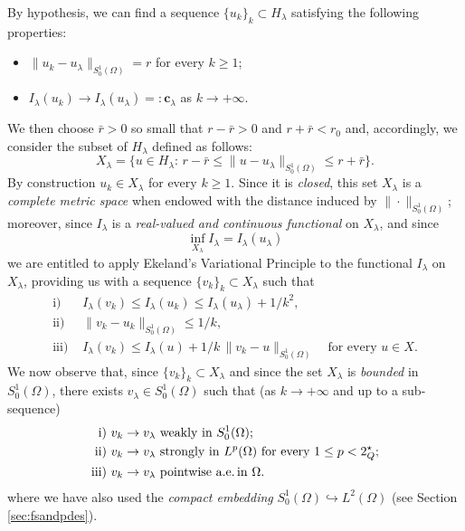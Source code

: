 \documentclass[11pt]{amsart}
\numberwithin{equation}{section} %
\theoremstyle{definition}
\begin{document}
By hypothesis,
we can find a sequence $\{u_k\}_k\subset H_{\lambda}$ satisfying the following properties:
\begin{itemize}
	\item $\|u_k-u_\lambda\|_{S^1_0(\Omega)} = r$ for every $k\geq 1$;	
	\item $I_\lambda(u_k)\to I_\lambda(u_\lambda) =:\mathbf{c}_\lambda$ as $k\to+\infty$.
\end{itemize}
We then choose $\bar r > 0$ so small that $r-\bar r > 0$ and $r+\bar r<r_0$ and,
accordingly, we consider the subset of $H_\lambda$ defined as follows:
$$X_\lambda = \{u\in H_\lambda:\,r-\bar r\leq\|u-u_\lambda\|_{S^1_0(\Omega)}\leq r+\bar r\}.$$
By construction $u_k\in X_\lambda$ for every $k\geq 1$.
Since it is \emph{closed}, this set $X_\lambda$
is a \emph{complete metric space} when endowed with the distance induced by $\|\cdot\|_{S^1_0(\Omega)}$;
moreover, since $I_\lambda$ is a \emph{real-valued and continuous functional} on $X_\lambda$, and since
$$\textstyle\inf_{X_\lambda}I_\lambda = I_\lambda(u_\lambda)$$
we are entitled to apply
 Ekeland's Variational Principle \cite{Ekeland} to the functional $I_\lambda$ on $X_\lambda$,
provi\-ding us with a sequence $\{v_k\}_k\subset X_\lambda$ such that
\begin{equation} \label{eq:EkelandCaseA}
	\begin{split}
		\mathrm{i)}&\,\, I_\lambda(v_k)\leq I_\lambda(u_k)\leq I_\lambda(u_\lambda)+1/k^2, \\
		\mathrm{ii)}&\,\,\|v_k-u_k\|_{S^1_0(\Omega)}\leq 1/k, \\
		\mathrm{iii)}&\,\, I_\lambda(v_k)\leq I_\lambda(u)+1/k\,
		\|v_k-u\|_{S^1_0(\Omega)}\quad\text{for every $u\in X$}.    
	\end{split}
\end{equation}
We now observe that, since $\{v_k\}_k\subset X_\lambda$ and since the set $X_\lambda$ is \emph{bounded}
in $S^1_0(\Omega)$, 
there exists  $v_\lambda\in S^1_0(\Omega)$ such that (as $k\to+\infty$ and 
up to a sub-sequence)
\begin{equation} \label{eq:limitvkCaseA}
	\begin{split}
		\mathrm{i)}&\,\,\text{$v_k\to v_\lambda$ weakly in $S^1_0(\Omega)$}; \\
		\mathrm{ii)}&\,\,\text{$v_k\to v_\lambda$ strongly in $L^p(\Omega)$ for every $1\leq p<2^\star_Q$}; \\
		\mathrm{iii)}&\,\,\text{$v_k\to v_\lambda$ pointwise
			a.e.\,in $\Omega$}.
	\end{split}
\end{equation}
where we have also used the \emph{compact embedding} 
$S^1_0(\Omega)\hookrightarrow L^2(\Omega)$ (see Section \ref{sec:fsandpdes}).
\end{document}
